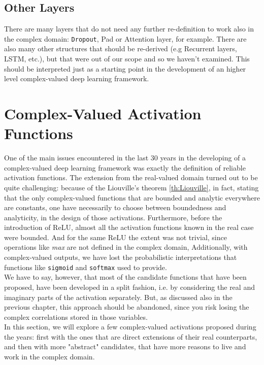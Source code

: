 \documentclass[../main.tex]{subfiles}
\begin{document}
\subsection*{Other Layers}
There are many layers that do not need any further re-definition to work also in the complex domain: \texttt{Dropout}, Pad or Attention layer, for example. There are also many other structures that should be re-derived (e.g Recurrent layers, LSTM, etc.), but that were out of our scope and so we haven't examined. This should be interpreted just as a starting point in the development of an higher level complex-valued deep learning framework.

\section{Complex-Valued Activation Functions}
\label{sec:cmplx_activations}

One of the main issues encountered in the last 30 years in the developing of a complex-valued deep learning framework was exactly the definition of reliable activation functions. The extension from the real-valued domain turned out to be quite challenging: because of the Liouville's theorem \ref{th:Liouville}, in fact, stating that the only complex-valued functions that are bounded and analytic everywhere are constants, one have necessarily to choose between boundedness and analyticity, in the design of those activations. Furthermore, before the introduction of ReLU, almost all the activation functions known in the real case were bounded. And for the same ReLU the extent was not trivial, since operations like \textit{max} are not defined in the complex domain, Additionally, with complex-valued outputs, we have lost the probabilistic interpretations that functions like \texttt{sigmoid} and \texttt{softmax} used to provide.\\
We have to say, however, that most of the candidate functions that have been proposed, have been developed in a split fashion, i.e. by considering the real and imaginary parts of the activation separately. But, as discussed also in the previous chapter, this approach should be abandoned, since you risk losing the complex correlations stored in those variables.\\
In this section, we will explore a few complex-valued activations proposed during the years: first with the ones that are direct extensions of their real counterparts, and then with more "abstract" candidates, that have more reasons to live and work in the complex domain.
\end{document}
